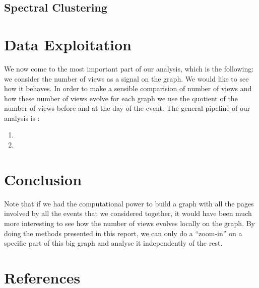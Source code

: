 \documentclass[conference]{IEEEtran}
\begin{document}
\subsection{Spectral Clustering }


\section{Data Exploitation}

We now come to the most important part of our analysis, which is the following: we consider the number of views as a signal on the graph. We would like to see how it behaves. In order to make a sensible comparision of number of views and how these number of views evolve for each graph we use the quotient of the number of views before and at the day of the event. 
The general pipeline of our analysis is :  

\begin{enumerate}
\item 
\item 
\end{enumerate}


\section{Conclusion}

Note that if we had the computational power to build a graph with all the pages involved by all the events that we considered together, it would have been much more interesting to see how the number of views evolves locally on the graph. By doing the methods presented in this report, we can only do a “zoom-in” on a specific part of this big graph and analyse it independently of the rest. 


\section*{References}


\cite{laplacian}  
\cite{signalprocessing}
\cite{clustering}



\end{document}
